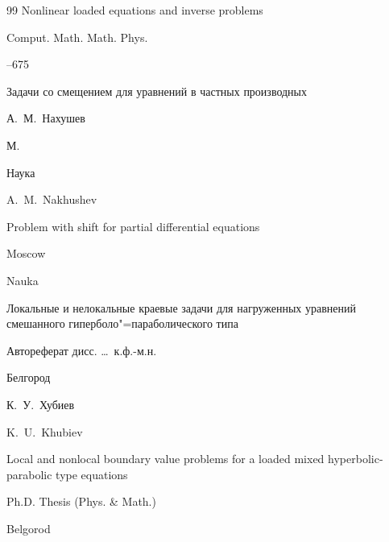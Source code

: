 \begin{thebibliography}{99}
\paper Nonlinear loaded equations and inverse problems

\jour Comput. Math. Math. Phys.




--675






\book Задачи со смещением для уравнений в частных производных

\by А.~М.~Нахушев

\publaddr М.

\publ Наука



\misctransl

\by A.~M.~Nakhushev 

\book Problem with shift for partial differential equations

\publaddr Moscow

\publ Nauka






\thesis Локальные и нелокальные краевые задачи для нагруженных уравнений смешанного гиперболо"=параболического типа

\thesisinfo Автореферат дисс. \dots\ к.ф.-м.н.

\publaddr  Белгород

\by К.~У.~Хубиев



\misctransl

\by K.~U.~Khubiev

\thesis Local and nonlocal boundary value problems for a loaded  mixed hyperbolic-parabolic type equations 

\thesisinfo Ph.D. Thesis (Phys. \& Math.)

\publaddr  Belgorod












\end{thebibliography}
